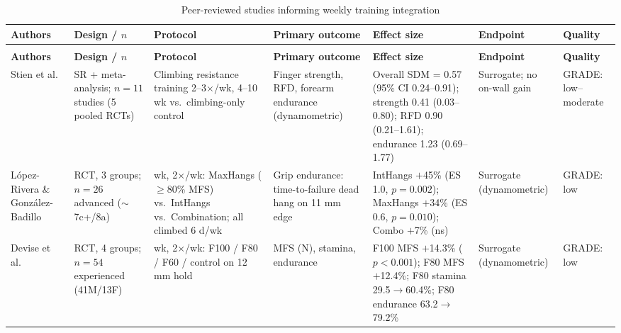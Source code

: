 {\footnotesize
\setlength{\tabcolsep}{4pt}
\renewcommand{\arraystretch}{1.2}
\begin{longtable}{>{\raggedright\arraybackslash}p{2.2cm}
                  >{\raggedright\arraybackslash}p{2.0cm}
                  >{\raggedright\arraybackslash}p{2.6cm}
                  >{\raggedright\arraybackslash}p{2.5cm}
                  >{\raggedright\arraybackslash}p{2.8cm}
                  >{\raggedright\arraybackslash}p{1.4cm}
                  >{\raggedright\arraybackslash}p{1.2cm}}
\caption{Peer-reviewed studies informing weekly training integration}
\label{tab:weekly_studies}\\
\toprule
\textbf{Authors} & \textbf{Design / $n$} & \textbf{Protocol} & \textbf{Primary outcome} & \textbf{Effect size} & \textbf{Endpoint} & \textbf{Quality} \\
\midrule
\endfirsthead
\multicolumn{7}{l}{\small\itshape Table \ref{tab:weekly_studies} continued\ldots} \\
\toprule
\textbf{Authors} & \textbf{Design / $n$} & \textbf{Protocol} & \textbf{Primary outcome} & \textbf{Effect size} & \textbf{Endpoint} & \textbf{Quality} \\
\midrule
\endhead
\bottomrule
\endlastfoot

Stien et al.\ \cite{SO23}
& SR + meta-analysis; $n = 11$ studies (5 pooled RCTs)
& Climbing resistance training 2–3$\times$/wk, 4–10 wk vs.\ climbing-only control
& Finger strength, RFD, forearm endurance (dynamometric)
& Overall SDM = 0.57 (95\% CI 0.24–0.91); strength 0.41 (0.03–0.80); RFD 0.90 (0.21–1.61); endurance 1.23 (0.69–1.77)
& Surrogate; no on-wall gain
& GRADE: low–moderate \\

López-Rivera \& González-Badillo \cite{LRGB19}
& RCT, 3 groups; $n = 26$ advanced ($\sim$7c+/8a)
& 8 wk, 2$\times$/wk: MaxHangs ($\geq$80\% MFS) vs.\ IntHangs vs.\ Combination; all climbed 6 d/wk
& Grip endurance: time-to-failure dead hang on 11 mm edge
& IntHangs $+$45\% (ES 1.0, $p=0.002$); MaxHangs $+$34\% (ES 0.6, $p=0.010$); Combo $+$7\% (ns)
& Surrogate (dynamometric)
& GRADE: low \\

Devise et al.\ \cite{DO22}
& RCT, 4 groups; $n = 54$ experienced (41M/13F)
& 4 wk, 2$\times$/wk: F100 / F80 / F60 / control on 12 mm hold
& MFS (N), stamina, endurance
& F100 MFS $+$14.3\% ($p<0.001$); F80 MFS $+$12.4\%; F80 stamina 29.5$\to$60.4\%; F80 endurance 63.2$\to$79.2\%
& Surrogate (dynamometric)
& GRADE: low \\


\end{longtable}}
